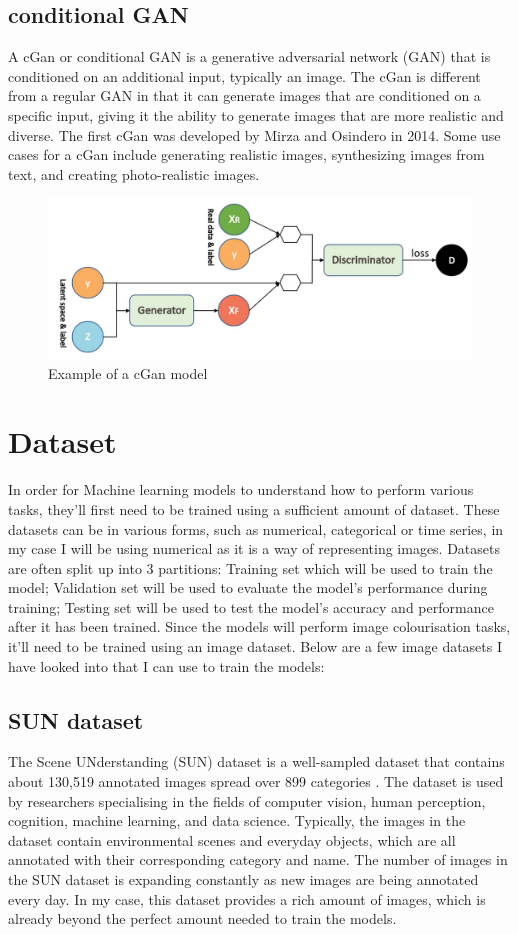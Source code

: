 \subsection{conditional GAN}
A cGan or conditional GAN is a generative adversarial network (GAN) that is conditioned on an additional input, typically an image. The cGan is different from a regular GAN in that it can generate images that are conditioned on a specific input, giving it the ability to generate images that are more realistic and diverse. The first cGan was developed by Mirza and Osindero in 2014. Some use cases for a cGan include generating realistic images, synthesizing images from text, and creating photo-realistic images\cite{frumkin_manipula_kachai_fehr_sewell}.
\begin{figure}[H]
    \centering
    \includegraphics[width=0.7\columnwidth]{sections/figures/cgan.jpg}
    \caption{Example of a cGan model \cite{bagheri_2019}}
    \label{fig:my_label}
\end{figure}



\newpage
\section{Dataset}
In order for Machine learning models to understand how to perform various tasks, they'll first need to be trained using a sufficient amount of dataset. These datasets can be in various forms, such as numerical, categorical or time series, in my case I will be using numerical as it is a way of representing images. Datasets are often split up into 3 partitions: Training set which will be used to train the model; Validation set will be used to evaluate the model's performance during training; Testing set will be used to test the model's accuracy and performance after it has been trained. Since the models will perform image colourisation tasks, it'll need to be trained using an image dataset. Below are a few image datasets I have looked into that I can use to train the models:
\subsection{SUN dataset}
The Scene UNderstanding (SUN) dataset is a well-sampled dataset that contains about 130,519 annotated images spread over 899 categories \cite{sun}. The dataset is used by researchers specialising in the fields of computer vision, human perception, cognition, machine learning, and data science. Typically, the images in the dataset contain environmental scenes and everyday objects, which are all annotated with their corresponding category and name. The number of images in the SUN dataset is expanding constantly as new images are being annotated every day. In my case, this dataset provides a rich amount of images, which is already beyond the perfect amount needed to train the models.

